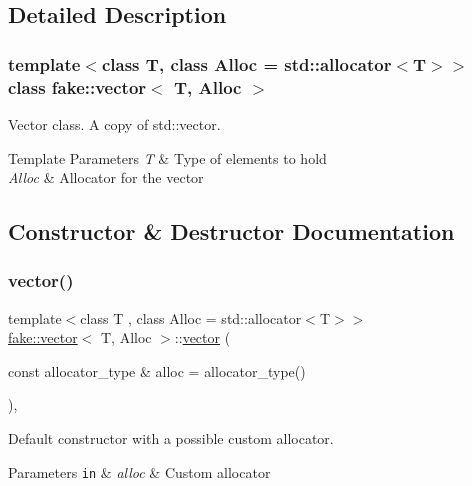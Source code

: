 \subsection{Detailed Description}
\subsubsection*{template$<$class T, class Alloc = std\+::allocator$<$\+T$>$$>$\newline
class fake\+::vector$<$ T, Alloc $>$}

Vector class. A copy of std\+::vector. 


\begin{DoxyTemplParams}{Template Parameters}
{\em T} & Type of elements to hold \\
\hline
{\em Alloc} & Allocator for the vector \\
\hline
\end{DoxyTemplParams}


\subsection{Constructor \& Destructor Documentation}
\mbox{\label{classfake_1_1vector_a154ffc548c4e8e0684c6928ab0b7d753}} 
\subsubsection{\texorpdfstring{vector()}{vector()}\hspace{0.1cm}{\footnotesize\ttfamily [1/9]}}
{\footnotesize\ttfamily template$<$class T , class Alloc  = std\+::allocator$<$\+T$>$$>$ \\
\mbox{\hyperlink{classfake_1_1vector}{fake\+::vector}}$<$ T, Alloc $>$\+::\mbox{\hyperlink{classfake_1_1vector}{vector}} (\begin{DoxyParamCaption}\item[{const allocator\+\_\+type \&}]{alloc = {\ttfamily allocator\+\_\+type()} }\end{DoxyParamCaption})\hspace{0.3cm}{\ttfamily [inline]}, {\ttfamily [explicit]}}



Default constructor with a possible custom allocator. 


\begin{DoxyParams}[1]{Parameters}
\mbox{\tt in}  & {\em alloc} & Custom allocator \\
\hline
\end{DoxyParams}
\mbox{\label{classfake_1_1vector_a3dec57e3a9ad5a085291f8ce5ba23465}} 
